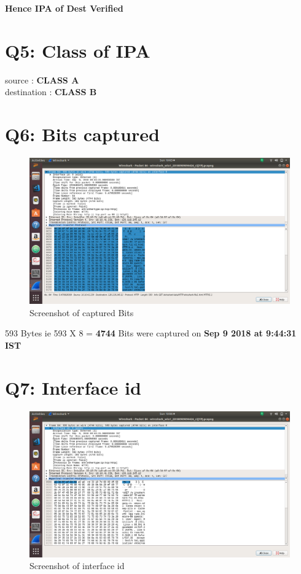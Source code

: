 \documentclass{article}
\begin{document}
 \textbf{Hence IPA of Dest Verified}
 
\section{Q5: Class of IPA}
 source      : \textbf{CLASS A}\\
 destination : \textbf{CLASS B}
 
 
\section{Q6: Bits captured}
 \begin{figure}[H]
 \centering
 \includegraphics[width=1.0\textwidth]{../q6/a.png}
 \caption{\label{fig:PING}Screenshot of captured Bits}
 \end{figure}
 
 593 Bytes ie 593 X 8 = \textbf{4744} Bits were captured on \textbf{ Sep 9 2018 at 9:44:31 IST}
 
\section{Q7: Interface id}
 \begin{figure}[H]
 \centering
 \includegraphics[width=1.0\textwidth]{../q7/a.png}
 \caption{\label{fig:PING}Screenshot of interface id}
 \end{figure}
 
\end{document}
